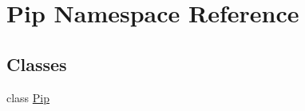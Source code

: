 \hypertarget{namespace_pip}{\section{Pip Namespace Reference}
\label{namespace_pip}
}
\subsection*{Classes}
\begin{DoxyCompactItemize}
\item 
class \hyperlink{class_pip_1_1_pip}{Pip}
\end{DoxyCompactItemize}
